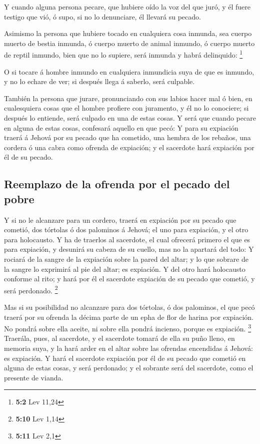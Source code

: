  Y cuando alguna persona pecare, que hubiere oído la voz
del que juró, y él fuere testigo que vió, ó supo, si no lo denunciare,
él llevará su pecado.

 Asimismo la persona que hubiere tocado en cualquiera cosa
inmunda, sea cuerpo muerto de bestia inmunda, ó cuerpo muerto de animal
inmundo, ó cuerpo muerto de reptil inmundo, bien que no lo supiere, será
inmunda y habrá delinquido: \footnote{\textbf{5:2} Lev 11,24}

 O si tocare á hombre inmundo en cualquiera inmundicia
suya de que es inmundo, y no lo echare de ver; si después llega á
saberlo, será culpable.

 También la persona que jurare, pronunciando con sus
labios hacer mal ó bien, en cualesquiera cosas que el hombre profiere
con juramento, y él no lo conociere; si después lo entiende, será
culpado en una de estas cosas.  Y será que cuando pecare
en alguna de estas cosas, confesará aquello en que pecó: 
Y para su expiación traerá á Jehová por su pecado que ha cometido, una
hembra de los rebaños, una cordera ó una cabra como ofrenda de
expiación; y el sacerdote hará expiación por él de su pecado.

\hypertarget{reemplazo-de-la-ofrenda-por-el-pecado-del-pobre}{%
\subsection{Reemplazo de la ofrenda por el pecado del
pobre}\label{reemplazo-de-la-ofrenda-por-el-pecado-del-pobre}}

 Y si no le alcanzare para un cordero, traerá en expiación
por su pecado que cometió, dos tórtolas ó dos palominos á Jehová; el uno
para expiación, y el otro para holocausto.  Y ha de
traerlos al sacerdote, el cual ofrecerá primero el que es para
expiación, y desunirá su cabeza de su cuello, mas no la apartará del
todo:  Y rociará de la sangre de la expiación sobre la
pared del altar; y lo que sobrare de la sangre lo exprimirá al pie del
altar; es expiación.  Y del otro hará holocausto conforme
al rito; y hará por él el sacerdote expiación de su pecado que cometió,
y será perdonado. \footnote{\textbf{5:10} Lev 1,14}

 Mas si su posibilidad no alcanzare para dos tórtolas, ó
dos palominos, el que pecó traerá por su ofrenda la décima parte de un
epha de flor de harina por expiación. No pondrá sobre ella aceite, ni
sobre ella pondrá incienso, porque es expiación. \footnote{\textbf{5:11}
  Lev 2,1}  Traerála, pues, al sacerdote, y el sacerdote
tomará de ella su puño lleno, en memoria suya, y la hará arder en el
altar sobre las ofrendas encendidas á Jehová: es expiación.
 Y hará el sacerdote expiación por él de su pecado que
cometió en alguna de estas cosas, y será perdonado; y el sobrante será
del sacerdote, como el presente de vianda.

